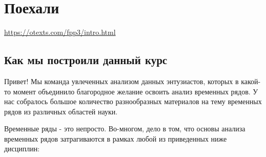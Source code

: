 \chapter{Поехали}
\url{https://otexts.com/fpp3/intro.html}

\section{Как мы построили данный курс}

Привет! Мы команда увлеченных анализом данных энтузиастов, которых в
какой-то момент объединило благородное желание освоить анализ
временных рядов. У нас собралось большое количество
разнообразных материалов на
тему временных рядов из различных областей науки.

Временные ряды - это непросто. Во-многом, дело в том, что основы
анализа временных рядов затрагиваются
в рамках любой из приведенных ниже дисциплин:
